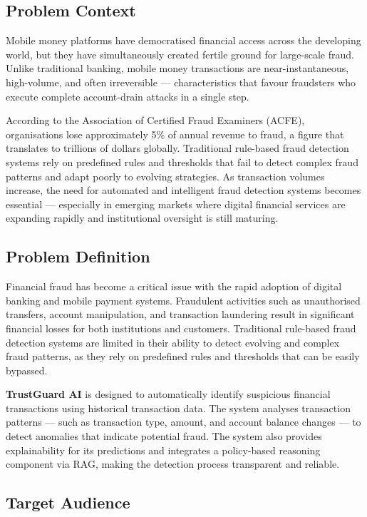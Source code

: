 \documentclass[12pt,a4paper]{article}
\begin{document}
\subsection{Problem Context}

Mobile money platforms have democratised financial access across the developing world, but they have simultaneously created fertile ground for large-scale fraud. Unlike traditional banking, mobile money transactions are near-instantaneous, high-volume, and often irreversible --- characteristics that favour fraudsters who execute complete account-drain attacks in a single step.

According to the Association of Certified Fraud Examiners (ACFE), organisations lose approximately 5\% of annual revenue to fraud, a figure that translates to trillions of dollars globally. Traditional rule-based fraud detection systems rely on predefined rules and thresholds that fail to detect complex fraud patterns and adapt poorly to evolving strategies. As transaction volumes increase, the need for automated and intelligent fraud detection systems becomes essential --- especially in emerging markets where digital financial services are expanding rapidly and institutional oversight is still maturing.

\subsection{Problem Definition}

Financial fraud has become a critical issue with the rapid adoption of digital banking and mobile payment systems. Fraudulent activities such as unauthorised transfers, account manipulation, and transaction laundering result in significant financial losses for both institutions and customers. Traditional rule-based fraud detection systems are limited in their ability to detect evolving and complex fraud patterns, as they rely on predefined rules and thresholds that can be easily bypassed.

\textbf{TrustGuard AI} is designed to automatically identify suspicious financial transactions using historical transaction data. The system analyses transaction patterns --- such as transaction type, amount, and account balance changes --- to detect anomalies that indicate potential fraud. The system also provides explainability for its predictions and integrates a policy-based reasoning component via RAG, making the detection process transparent and reliable.

\subsection{Target Audience}
\end{document}
